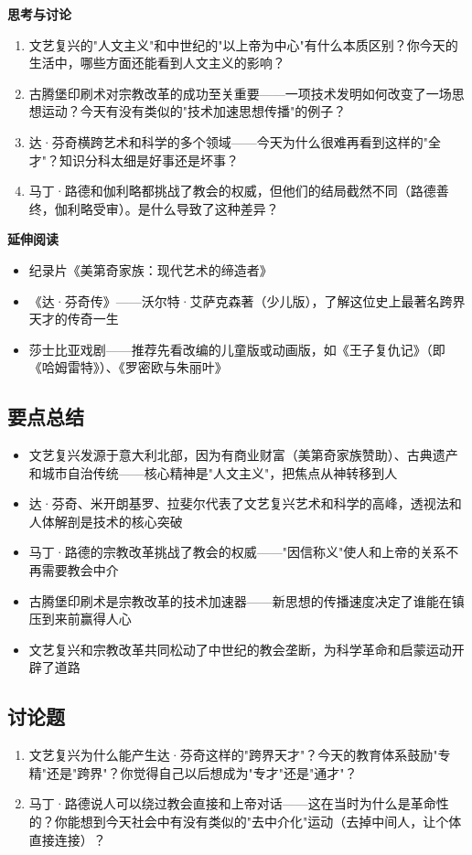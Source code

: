 \documentclass[a4paper,12pt]{ctexart}
\begin{document}
\vspace{0.3cm}
{\large\textcolor{orange!80!black}{\textbf{思考与讨论}}}
\begin{enumerate}
  \item 文艺复兴的"人文主义"和中世纪的"以上帝为中心"有什么本质区别？你今天的生活中，哪些方面还能看到人文主义的影响？
  \item 古腾堡印刷术对宗教改革的成功至关重要——一项技术发明如何改变了一场思想运动？今天有没有类似的"技术加速思想传播"的例子？
  \item 达·芬奇横跨艺术和科学的多个领域——今天为什么很难再看到这样的"全才"？知识分科太细是好事还是坏事？
  \item 马丁·路德和伽利略都挑战了教会的权威，但他们的结局截然不同（路德善终，伽利略受审）。是什么导致了这种差异？
\end{enumerate}

\vspace{0.3cm}
\textcolor{blue!70!black}{\textbf{延伸阅读}}
\begin{itemize}
  \item 纪录片《美第奇家族：现代艺术的缔造者》
  \item 《达·芬奇传》——沃尔特·艾萨克森著（少儿版），了解这位史上最著名跨界天才的传奇一生
  \item 莎士比亚戏剧——推荐先看改编的儿童版或动画版，如《王子复仇记》（即《哈姆雷特》）、《罗密欧与朱丽叶》
\end{itemize}

\subsection*{要点总结}
\begin{itemize}
  \item 文艺复兴发源于意大利北部，因为有商业财富（美第奇家族赞助）、古典遗产和城市自治传统——核心精神是"人文主义"，把焦点从神转移到人
  \item 达·芬奇、米开朗基罗、拉斐尔代表了文艺复兴艺术和科学的高峰，透视法和人体解剖是技术的核心突破
  \item 马丁·路德的宗教改革挑战了教会的权威——"因信称义"使人和上帝的关系不再需要教会中介
  \item 古腾堡印刷术是宗教改革的技术加速器——新思想的传播速度决定了谁能在镇压到来前赢得人心
  \item 文艺复兴和宗教改革共同松动了中世纪的教会垄断，为科学革命和启蒙运动开辟了道路
\end{itemize}

\subsection*{讨论题}
\begin{enumerate}
  \item 文艺复兴为什么能产生达·芬奇这样的"跨界天才"？今天的教育体系鼓励"专精"还是"跨界"？你觉得自己以后想成为"专才"还是"通才"？
  \item 马丁·路德说人可以绕过教会直接和上帝对话——这在当时为什么是革命性的？你能想到今天社会中有没有类似的"去中介化"运动（去掉中间人，让个体直接连接）？
\end{enumerate}
\end{document}
